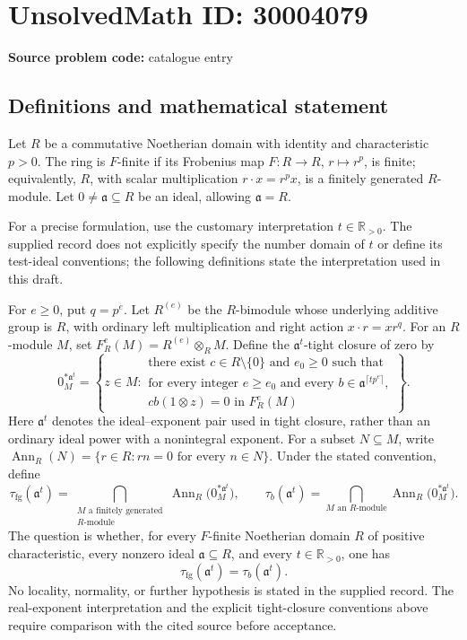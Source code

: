 \documentclass[11pt]{article}
\newcommand{\R}{\mathbb{R}}
\begin{document}
\section*{UnsolvedMath ID: 30004079}
\textbf{Source problem code:} catalogue entry
\subsection{Definitions and mathematical statement}
Let \(R\) be a commutative Noetherian domain with identity and characteristic \(p>0\). The ring is \(F\)-finite if its Frobenius map \(F:R\to R\), \(r\mapsto r^p\), is finite; equivalently, \(R\), with scalar multiplication \(r\cdot x=r^p x\), is a finitely generated \(R\)-module. Let \(0\ne\mathfrak a\subseteq R\) be an ideal, allowing \(\mathfrak a=R\).

For a precise formulation, use the customary interpretation \(t\in\R_{>0}\). The supplied record does not explicitly specify the number domain of \(t\) or define its test-ideal conventions; the following definitions state the interpretation used in this draft.

For \(e\geq0\), put \(q=p^e\). Let \(R^{(e)}\) be the \(R\)-bimodule whose underlying additive group is \(R\), with ordinary left multiplication and right action \(x\cdot r=xr^q\). For an \(R\)-module \(M\), set \(F_R^e(M)=R^{(e)}\otimes_R M\). Define the \(\mathfrak a^t\)-tight closure of zero by
\[
0_M^{*\mathfrak a^t}
=
\left\{z\in M:\begin{array}{l}
\text{there exist }c\in R\setminus\{0\}\text{ and }e_0\geq0\text{ such that}\\
\text{for every integer }e\geq e_0\text{ and every }
 b\in\mathfrak a^{\lceil tp^e\rceil},\\
 cb(1\otimes z)=0\text{ in }F_R^e(M)
\end{array}\right\}.
\]
Here \(\mathfrak a^t\) denotes the ideal--exponent pair used in tight closure, rather than an ordinary ideal power with a nonintegral exponent. For a subset \(N\subseteq M\), write \(\operatorname{Ann}_R(N)=\{r\in R:rn=0\text{ for every }n\in N\}\). Under the stated convention, define
\[
\tau_{\mathrm{fg}}(\mathfrak a^t)
=\bigcap_{\substack{M\text{ a finitely generated}\\R\text{-module}}}
\operatorname{Ann}_R\bigl(0_M^{*\mathfrak a^t}\bigr),
\qquad
\tau_b(\mathfrak a^t)
=\bigcap_{M\text{ an }R\text{-module}}
\operatorname{Ann}_R\bigl(0_M^{*\mathfrak a^t}\bigr).
\]
The question is whether, for every \(F\)-finite Noetherian domain \(R\) of positive characteristic, every nonzero ideal \(\mathfrak a\subseteq R\), and every \(t\in\R_{>0}\), one has
\[
\tau_{\mathrm{fg}}(\mathfrak a^t)=\tau_b(\mathfrak a^t).
\]
No locality, normality, or further hypothesis is stated in the supplied record. The real-exponent interpretation and the explicit tight-closure conventions above require comparison with the cited source before acceptance.
\end{document}
